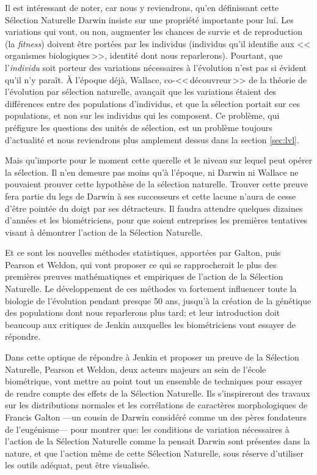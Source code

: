 	Il est intéressant de noter, car nous y reviendrons, qu'en définissant cette Sélection Naturelle Darwin insiste sur une propriété importante pour lui. Les variations qui vont, ou non, augmenter les chances de survie et de reproduction (la \emph{fitness}) doivent être portées par les individus (individus qu'il identifie aux <<\,organismes biologiques\,>>, identité dont nous reparlerons). Pourtant, que l'\emph{individu} soit porteur des variations nécessaires à l'évolution n'est pas si évident qu'il n'y paraît. À l'époque déjà, Wallace, co-<<\,découvreur\,>> de la théorie de l'évolution par sélection naturelle, avançait que les variations étaient des différences entre des populations d'individus, et que la sélection portait sur ces populations, et non sur les individus qui les composent. Ce problème, qui préfigure les questions des unités de sélection, est un problème toujours d'actualité et nous reviendrons plus amplement dessus dans la section \ref{sec:lvl}. 

Mais qu'importe pour le moment cette querelle et le niveau sur lequel peut opérer la sélection. Il n'en demeure pas moins qu'à l'époque, ni Darwin ni Wallace ne pouvaient prouver cette hypothèse de la sélection naturelle. Trouver cette preuve fera partie du legs de Darwin à ses successeurs et cette lacune n'aura de cesse d'être pointée du doigt par ses détracteurs. Il faudra attendre quelques dizaines d'années et les biométriciens, pour que soient entreprises les premières tentatives visant à démontrer l'action de la Sélection Naturelle.

Et ce sont les nouvelles méthodes statistiques, apportées par Galton, puis Pearson et Weldon, qui vont proposer ce qui se rapprocherait le plus des premières preuves mathématiques et empiriques de l'action de la Sélection Naturelle. Le développement de ces méthodes va fortement influencer toute la biologie de l'évolution pendant presque 50 ans, jusqu'à la création de la génétique des populations dont nous reparlerons plus tard; et leur introduction doit beaucoup aux critiques de Jenkin auxquelles les biométriciens vont essayer de répondre.

Dans cette optique de répondre à Jenkin et proposer un preuve de la Sélection Naturelle, Pearson et Weldon, deux acteurs majeurs au sein de l'école biométrique, vont mettre au point tout un ensemble de techniques pour essayer de rendre compte des effets de la Sélection Naturelle. Ils s'inspireront des travaux sur les distributions normales et les corrélations de caractères morphologiques de Francis Galton ---un cousin de Darwin considéré comme un des pères fondateurs de l'eugénisme--- pour montrer que: les conditions de variation nécessaires à l'action de la Sélection Naturelle comme la pensait Darwin sont présentes dans la nature, et que l'action même de cette Sélection Naturelle, sous réserve d'utiliser les outils adéquat, peut être visualisée. 

